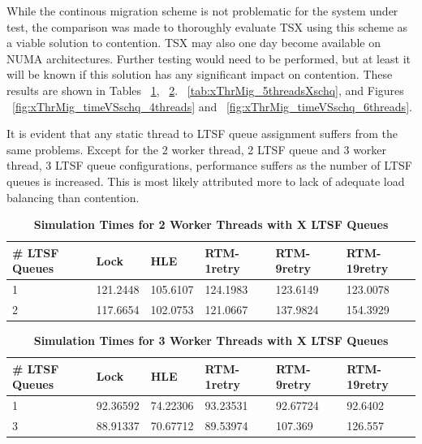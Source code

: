 \documentclass[11pt]{book}
\begin{document}
While the continous migration scheme is not problematic for the system under
test, the comparison was made to thoroughly evaluate TSX using this scheme as a
viable solution to contention.  TSX may also one day become available on NUMA
architectures.  Further testing would need to be performed, but at least it will
be known if this solution has any significant impact on contention.  These
results are shown in Tables ~\ref{tab:xThrMig_2threadsXschq},
~\ref{tab:xThrMig_3threadsXschq}.  ~\ref{tab:xThrMig_5threadsXschq}, and Figures
~\ref{fig:xThrMig_timeVSschq_4threads} and
~\ref{fig:xThrMig_timeVSschq_6threads}.

It is evident that any static thread to LTSF queue assignment suffers from the
same problems.  Except for the 2 worker thread, 2 LTSF queue and 3 worker
thread, 3 LTSF queue configurations, performance suffers as the number of LTSF
queues is increased.  This is most likely attributed more to lack of adequate
load balancing than contention.

\begin{table}[H]
    \centering
    \begin{tabular}{l|p{2cm}|p{2cm}|p{2cm}|p{2cm}|p{2cm}}
        \textbf{\# LTSF Queues}&Lock &HLE &RTM-1retry &RTM-9retry &RTM-19retry \\
        \hline
        \midrule
            1 &121.2448  &105.6107 &124.1983 &123.6149 &123.0078\\ 
            2 &117.6654  &102.0753 &121.0667 &137.9824 &154.3929\\
    \end{tabular}
    \caption{\textbf{Simulation Times for 2 Worker Threads with X LTSF Queues}}
    \label{tab:xThrMig_2threadsXschq}
\end{table}

\begin{table}[H]
    \centering
    \begin{tabular}{l|p{2cm}|p{2cm}|p{2cm}|p{2cm}|p{2cm}}
        \textbf{\# LTSF Queues}&Lock &HLE &RTM-1retry &RTM-9retry &RTM-19retry \\
        \hline
        \midrule
            1 &92.36592  &74.22306 &93.23531  &92.67724 &92.6402 \\ 
            3 &88.91337  &70.67712 &89.53974  &107.369  &126.557 \\
    \end{tabular}
    \caption{\textbf{Simulation Times for 3 Worker Threads with X LTSF Queues}}
    \label{tab:xThrMig_3threadsXschq}
\end{table}
\end{document}
